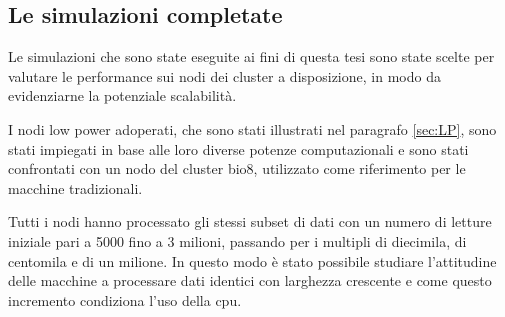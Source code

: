 %
%
 
\subsection{Le simulazioni completate} 
\label{subsec:simc}
Le simulazioni che sono state eseguite ai fini di questa tesi sono state scelte per valutare le performance sui nodi dei cluster a disposizione, in modo da evidenziarne la potenziale scalabilità.

I nodi low power adoperati, che sono stati illustrati nel paragrafo \ref{sec:LP}, sono stati impiegati in base alle loro diverse potenze computazionali e sono stati confrontati con un nodo del cluster bio8, utilizzato come riferimento per le macchine tradizionali.  

Tutti i nodi hanno processato gli stessi subset di dati con un numero di letture iniziale pari a 5000 fino a 3 milioni, passando per i multipli di diecimila, di centomila e di un milione.
In questo modo è stato possibile studiare l'attitudine delle macchine a processare dati identici con larghezza crescente e come questo incremento condiziona l'uso della cpu. 

